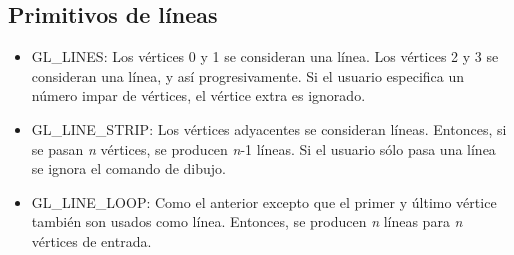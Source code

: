 \subsection{Primitivos de líneas}
\begin{itemize}
\item{GL\_LINES: Los vértices 0 y 1 se consideran una línea. Los vértices 2 y 3 se consideran una línea, y así progresivamente. Si el usuario especifica un número impar de vértices, el vértice extra es ignorado.}
\item{GL\_LINE\_STRIP: Los vértices adyacentes se consideran líneas. Entonces, si se pasan \textit{n} vértices, se producen \textit{n}-1 líneas. Si el usuario sólo pasa una línea se ignora el comando de dibujo.}
\item{GL\_LINE\_LOOP: Como el anterior excepto que el primer y último vértice también son usados como línea. Entonces, se producen \textit{n} líneas para \textit{n} vértices de entrada.}
\end{itemize}


